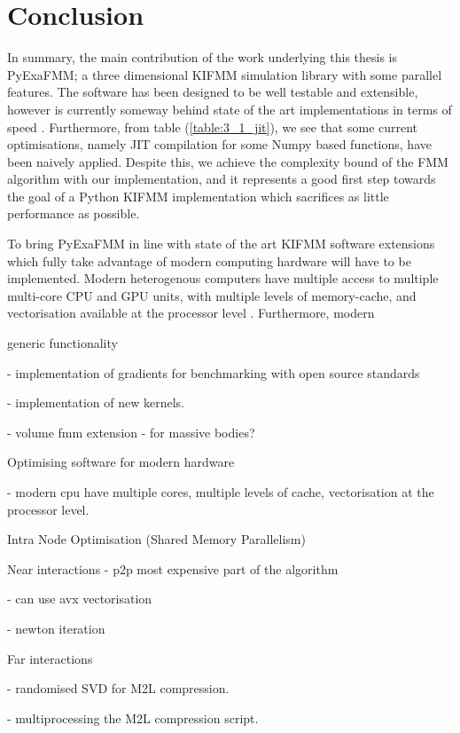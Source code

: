 \chapter{Conclusion}\label{chpt:conclusion}

In summary, the main contribution of the work underlying this thesis is
\gls{PyExaFMM}; a three dimensional \gls{KIFMM} simulation library
with some parallel features. The software has been designed to be well
testable and extensible, however is currently someway behind state of the art
implementations in terms of speed \cite{exafmm,Malhotra:2015:CCP}.
Furthermore, from table (\ref{table:3_1_jit}),
we see that some current optimisations, namely \gls{JIT} compilation for some
Numpy based functions, have been naively applied. Despite this, we achieve the
complexity bound of the \gls{FMM} algorithm with our implementation, and it
represents a good first step towards the goal of a Python \gls{KIFMM} implementation
which sacrifices as little performance as possible.

To bring \gls{PyExaFMM} in line with state of the art \gls{KIFMM} software
extensions which fully take advantage of modern computing hardware will
have to be implemented. Modern heterogenous computers have multiple access to
multiple multi-core \gls{CPU} and \gls{GPU} units, with multiple levels of
memory-cache, and vectorisation available at the processor level
\cite{Malhotra:2015:CCP}. Furthermore, modern

generic functionality

- implementation of gradients for benchmarking with open source standards

- implementation of new kernels.

- volume fmm extension - for massive bodies?


Optimising software for modern hardware

- modern cpu have multiple cores, multiple levels of cache, vectorisation at
the processor level.

Intra Node Optimisation (Shared Memory Parallelism)

Near interactions
- p2p most expensive part of the algorithm

    - can use avx vectorisation

    - newton iteration

Far interactions

- randomised SVD for M2L compression.

- multiprocessing the M2L compression script.

